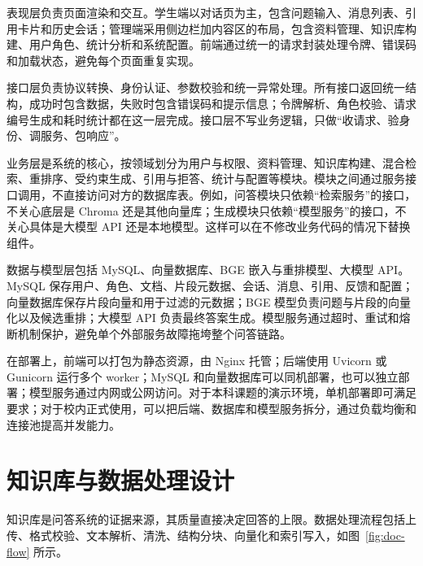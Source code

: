 表现层负责页面渲染和交互。学生端以对话页为主，包含问题输入、消息列表、引用卡片和历史会话；管理端采用侧边栏加内容区的布局，包含资料管理、知识库构建、用户角色、统计分析和系统配置。前端通过统一的请求封装处理令牌、错误码和加载状态，避免每个页面重复实现。

接口层负责协议转换、身份认证、参数校验和统一异常处理。所有接口返回统一结构，成功时包含数据，失败时包含错误码和提示信息；令牌解析、角色校验、请求编号生成和耗时统计都在这一层完成。接口层不写业务逻辑，只做“收请求、验身份、调服务、包响应”。

业务层是系统的核心，按领域划分为用户与权限、资料管理、知识库构建、混合检索、重排序、受约束生成、引用与拒答、统计与配置等模块。模块之间通过服务接口调用，不直接访问对方的数据库表。例如，问答模块只依赖“检索服务”的接口，不关心底层是 Chroma 还是其他向量库；生成模块只依赖“模型服务”的接口，不关心具体是大模型 API 还是本地模型。这样可以在不修改业务代码的情况下替换组件。

数据与模型层包括 MySQL、向量数据库、BGE 嵌入与重排模型、大模型 API。MySQL 保存用户、角色、文档、片段元数据、会话、消息、引用、反馈和配置；向量数据库保存片段向量和用于过滤的元数据；BGE 模型负责问题与片段的向量化以及候选重排；大模型 API 负责最终答案生成。模型服务通过超时、重试和熔断机制保护，避免单个外部服务故障拖垮整个问答链路。

在部署上，前端可以打包为静态资源，由 Nginx 托管；后端使用 Uvicorn 或 Gunicorn 运行多个 worker；MySQL 和向量数据库可以同机部署，也可以独立部署；模型服务通过内网或公网访问。对于本科课题的演示环境，单机部署即可满足要求；对于校内正式使用，可以把后端、数据库和模型服务拆分，通过负载均衡和连接池提高并发能力。

\section{知识库与数据处理设计}
\label{sec:kb-design}

知识库是问答系统的证据来源，其质量直接决定回答的上限。数据处理流程包括上传、格式校验、文本解析、清洗、结构分块、向量化和索引写入，如图~\ref{fig:doc-flow} 所示。


